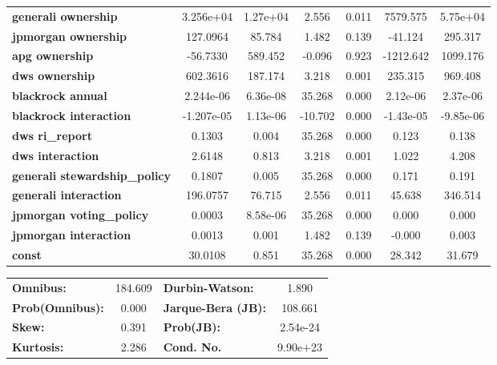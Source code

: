 \documentclass[a4paper]{article}
\begin{document}
\begin{center}
\begin{tabular}{lcccccc}
    \textbf{generali ownership}           &    3.256e+04  &     1.27e+04     &     2.556  &         0.011        &     7579.575    &     5.75e+04     \\
    \textbf{jpmorgan ownership}           &     127.0964  &       85.784     &     1.482  &         0.139        &      -41.124    &      295.317     \\
    \textbf{apg ownership}                &     -56.7330  &      589.452     &    -0.096  &         0.923        &    -1212.642    &     1099.176     \\
    \textbf{dws ownership}                &     602.3616  &      187.174     &     3.218  &         0.001        &      235.315    &      969.408     \\
    \textbf{blackrock annual}             &    2.244e-06  &     6.36e-08     &    35.268  &         0.000        &     2.12e-06    &     2.37e-06     \\
    \textbf{blackrock interaction}        &   -1.207e-05  &     1.13e-06     &   -10.702  &         0.000        &    -1.43e-05    &    -9.85e-06     \\
    \textbf{dws ri\_report}               &       0.1303  &        0.004     &    35.268  &         0.000        &        0.123    &        0.138     \\
    \textbf{dws interaction}              &       2.6148  &        0.813     &     3.218  &         0.001        &        1.022    &        4.208     \\
    \textbf{generali stewardship\_policy} &       0.1807  &        0.005     &    35.268  &         0.000        &        0.171    &        0.191     \\
    \textbf{generali interaction}         &     196.0757  &       76.715     &     2.556  &         0.011        &       45.638    &      346.514     \\
    \textbf{jpmorgan voting\_policy}      &       0.0003  &     8.58e-06     &    35.268  &         0.000        &        0.000    &        0.000     \\
    \textbf{jpmorgan interaction}         &       0.0013  &        0.001     &     1.482  &         0.139        &       -0.000    &        0.003     \\
    \textbf{const}                        &      30.0108  &        0.851     &    35.268  &         0.000        &       28.342    &       31.679     \\
    \bottomrule
    \end{tabular}
    \begin{tabular}{lclc}
    \textbf{Omnibus:}       & 184.609 & \textbf{  Durbin-Watson:     } &    1.890  \\
    \textbf{Prob(Omnibus):} &   0.000 & \textbf{  Jarque-Bera (JB):  } &  108.661  \\
    \textbf{Skew:}          &   0.391 & \textbf{  Prob(JB):          } & 2.54e-24  \\
    \textbf{Kurtosis:}      &   2.286 & \textbf{  Cond. No.          } & 9.90e+23  \\
    \bottomrule
    \end{tabular}
    \end{center}
\end{document}
